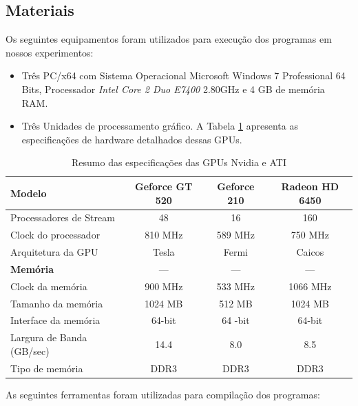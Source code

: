 \subsection{Materiais}
Os seguintes equipamentos foram utilizados para execução dos programas em nossos experimentos:
\begin{itemize}
\item Três PC/x64 com Sistema Operacional Microsoft Windows 7 Professional 64 Bits, Processador \textit{Intel\textregistered{} Core\texttrademark{} 2 Duo E7400} 2.80GHz e 4 GB de memória RAM.\\ 
\item Três Unidades de processamento gráfico. A Tabela \ref{tab:tab1} apresenta as especificações de hardware detalhados dessas GPUs.\newline

\end{itemize}
\begin{table}[!htb]
\begin{center}
\begin{tabular}{|l|c|c|c|}
\hline
Modelo & \textbf{Geforce GT 520} & \textbf{Geforce 210} & \textbf{Radeon HD 6450}\\ 
\hline
Processadores de Stream & 48 & 16 & 160  \\ 
\hline
Clock do processador& 810 MHz & 589 MHz & 750 MHz \\ 
\hline
Arquitetura da GPU & Tesla & Fermi & Caicos\\ 
\hline
\textbf{Memória}& --- & --- & --- \\
\hline
Clock da memória & 900 MHz & 533 MHz & 1066 MHz \\ 
\hline
Tamanho da memória & 1024 MB & 512 MB & 1024 MB \\ 
\hline
Interface da memória & 64-bit & 64 -bit & 64-bit \\ 
\hline
Largura de Banda (GB/sec)& 14.4 & 8.0 & 8.5 \\ 
\hline
Tipo de memória	& DDR3 & DDR3 & DDR3 \\ 
\hline
\end{tabular}
\caption{Resumo das especificações das GPUs Nvidia e ATI}
\label{tab:tab1}
\end{center}
\end{table}
As seguintes ferramentas foram utilizadas para compilação dos programas:\newline

